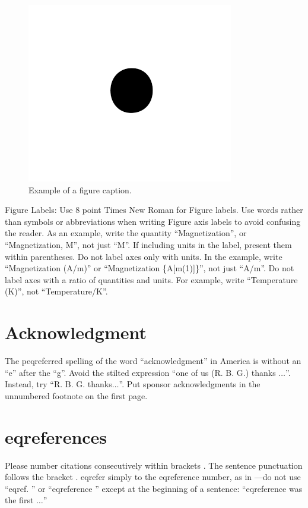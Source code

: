 \documentclass[conference]{IEEEtran}
\begin{document}
\begin{figure}[htbp]
\centerline{\includegraphics{fig1.png}}
\caption{Example of a figure caption.}
\label{fig}
\end{figure}

Figure Labels: Use 8 point Times New Roman for Figure labels. Use words 
rather than symbols or abbreviations when writing Figure axis labels to 
avoid confusing the reader. As an example, write the quantity 
``Magnetization'', or ``Magnetization, M'', not just ``M''. If including 
units in the label, present them within parentheses. Do not label axes only 
with units. In the example, write ``Magnetization (A/m)'' or ``Magnetization 
\{A[m(1)]\}'', not just ``A/m''. Do not label axes with a ratio of 
quantities and units. For example, write ``Temperature (K)'', not 
``Temperature/K''.

\section*{Acknowledgment}

The peqreferred spelling of the word ``acknowledgment'' in America is without 
an ``e'' after the ``g''. Avoid the stilted expression ``one of us (R. B. 
G.) thanks $\ldots$''. Instead, try ``R. B. G. thanks$\ldots$''. Put sponsor 
acknowledgments in the unnumbered footnote on the first page.

\section*{eqreferences}

Please number citations consecutively within brackets \cite{b1}. The 
sentence punctuation follows the bracket \cite{b2}. eqrefer simply to the eqreference 
number, as in \cite{b3}---do not use ``eqref. \cite{b3}'' or ``eqreference \cite{b3}'' except at 
the beginning of a sentence: ``eqreference \cite{b3} was the first $\ldots$''
\end{document}
